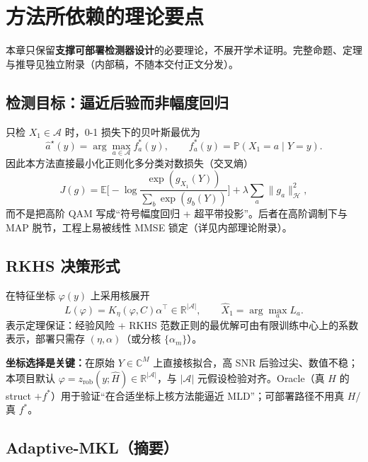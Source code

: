 \chapter{方法所依赖的理论要点}
\label{ch:theory}

本章只保留\textbf{支撑可部署检测器设计}的必要理论，不展开学术证明。完整命题、定理与推导见独立附录（内部稿，不随本交付正文分发）。

\section{检测目标：逼近后验而非幅度回归}

只检 $X_1\in\mathcal{A}$ 时，0-1 损失下的贝叶斯最优为
\begin{equation}
\hat a^{\star}(y)=\arg\max_{a\in\mathcal{A}} f_a^*(y),\qquad
f_a^*(y)=\mathbb{P}(X_1=a\mid Y=y).
\end{equation}
因此本方法直接最小化正则化多分类对数损失（交叉熵）
\begin{equation}
J(g)=\mathbb{E}\Big[-\log\frac{\exp(g_{X_1}(Y))}{\sum_b\exp(g_b(Y))}\Big]
+\lambda\sum_a\|g_a\|_{\mathcal{H}}^2,
\label{eq:Jtheory}
\end{equation}
而不是把高阶 QAM 写成“符号幅度回归 + 超平带投影”。后者在高阶调制下与 MAP 脱节，工程上易被线性 MMSE 锁定（详见内部理论附录）。

\section{RKHS 决策形式}

在特征坐标 $\varphi(y)$ 上采用核展开
\begin{equation}
L(\varphi)=K_\eta(\varphi,C)\alpha^\top\in\mathbb{R}^{|\mathcal{A}|},\qquad
\hat X_1=\arg\max_a L_a.
\end{equation}
表示定理保证：经验风险 + RKHS 范数正则的最优解可由有限训练中心上的系数表示，部署只需存 $(\eta,\alpha)$（或分核 $\{\alpha_m\}$）。

\textbf{坐标选择是关键：}在原始 $Y\in\mathbb{C}^{M}$ 上直接核拟合，高 SNR 后验过尖、数值不稳；本项目默认 $\varphi=z_{\mathrm{rob}}(y;\hat H)\in\mathbb{R}^{|\mathcal{A}|}$，与 $|\mathcal{A}|$ 元假设检验对齐。Oracle（真 $H$ 的 struct $+f^*$）用于验证“在合适坐标上核方法能逼近 MLD”；可部署路径不用真 $H$/真 $f^*$。

\section{Adaptive-MKL（摘要）}
\label{sec:mkl}

